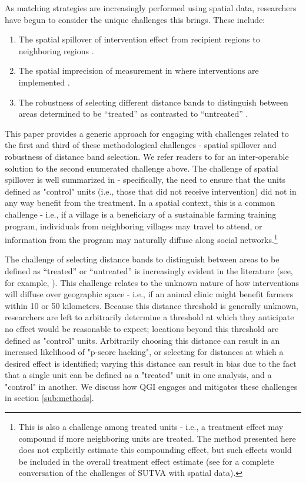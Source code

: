 \documentclass[sustainability,article,submit,moreauthors,pdftex]{Definitions/mdpi}
\begin{document}
\par
As matching strategies are increasingly performed using spatial data, researchers have begun to consider the unique challenges this brings.  These include:
\begin{enumerate}
    \item The spatial spillover of intervention effect from recipient regions to neighboring regions \cite{Runfola2017wb, Buchanan2016TheImportance}.
    \item The spatial imprecision of measurement in where interventions are implemented \cite{Marty2019AssessingImprecision}.
    \item The robustness of selecting different distance bands to distinguish between areas determined to be ``treated'' as contrasted to ``untreated'' \cite{BunteNaturalLiberia}.
\end{enumerate}
This paper provides a generic approach for engaging with challenges related to the first and third of these methodological challenges - spatial spillover and robustness of distance band selection.  We refer readers to \cite{Marty2019AssessingImprecision} for an inter-operable solution to the second enumerated challenge above.  The challenge of spatial spillover is well summarized in \cite{Buchanan2016TheImportance} - specifically, the need to ensure that the units defined as "control" units (i.e., those that did not receive intervention) did not in any way benefit from the treatment.  In a spatial context, this is a common challenge - i.e., if a village is a beneficiary of a sustainable farming training program, individuals from neighboring villages may travel to attend, or information from the program may naturally diffuse along social networks.\footnote{This is also a challenge among treated units - i.e., a treatment effect may compound if more neighboring units are treated.  The method presented here does not explicitly estimate this compounding effect, but such effects would be included in the overall treatment effect estimate (see \cite{Corrado2012} for a complete conversation of the challenges of SUTVA with spatial data).}
\par
The challenge of selecting distance bands to distinguish between areas to be defined as ``treated'' or ``untreated'' is increasingly evident in the literature (see, for example, \cite{BunteNaturalLiberia, Buchanan2016TheImportance}).  This challenge relates to the unknown nature of how interventions will diffuse over geographic space - i.e., if an animal clinic might benefit farmers within 10 or 50 kilometers.  Because this distance threshold is generally unknown, researchers are left to arbitrarily determine a threshold at which they anticipate no effect would be reasonable to expect; locations beyond this threshold are defined as "control" units.  Arbitrarily choosing this distance can result in an increased likelihood of "p-score hacking", or selecting for distances at which a desired effect is identified; varying this distance can result in bias due to the fact that a single unit can be defined as a "treated" unit in one analysis, and a "control" in another.  We discuss how QGI engages and mitigates these challenges in section \ref{sub:methods}.
\end{document}
